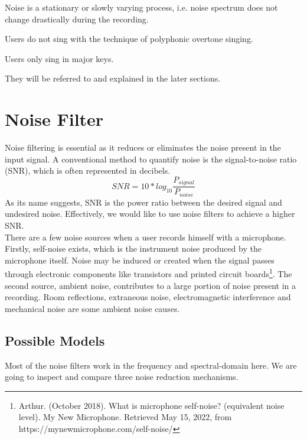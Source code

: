 \begin{assumption}\label{as:3}
    Noise is a stationary or slowly varying process, i.e. noise spectrum does not change drastically during the recording.
\end{assumption}

\begin{assumption}\label{as:4}
    Users do not sing with the technique of polyphonic overtone singing.
\end{assumption}

\begin{assumption}\label{as:5}
    Users only sing in major keys.
\end{assumption}

They will be referred to and explained in the later sections.

\section{Noise Filter}
\label{sec:NF}
Noise filtering is essential as it reduces or eliminates the noise present in the input signal.
A conventional method to quantify noise is the signal-to-noise ratio (SNR), which is often 
represented in decibels.
\[SNR=10*log_{10}\frac{P_{signal}}{P_{noise}}\]
As its name suggests, SNR is the power ratio between the desired signal and undesired noise. Effectively,
we would like to use noise filters to achieve a higher SNR.\\ 
There are a few noise sources when a user records himself with a microphone.
Firstly, self-noise exists, which is the instrument noise produced by the microphone itself.
Noise may be induced or created when the signal passes through electronic components like transistors 
and printed circuit boards\footnote{Arthur. (October 2018). What is microphone self-noise? (equivalent noise level). My New Microphone. Retrieved May 15, 2022, from https://mynewmicrophone.com/self-noise/ }.
The second source, ambient noise, contributes to a large portion of noise present in a recording.
Room reflections, extraneous noise, electromagnetic interference and mechanical noise are some ambient noise causes.  

\subsection{Possible Models}
Most of the noise filters work in the frequency and spectral-domain here. We are going to inspect and
compare three noise reduction mechanisms.

